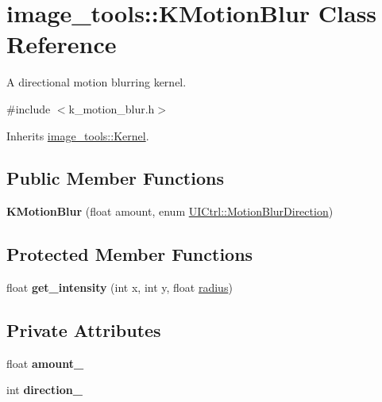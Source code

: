 \hypertarget{classimage__tools_1_1KMotionBlur}{}\section{image\+\_\+tools\+:\+:K\+Motion\+Blur Class Reference}
\label{classimage__tools_1_1KMotionBlur}


A directional motion blurring kernel.  




{\ttfamily \#include $<$k\+\_\+motion\+\_\+blur.\+h$>$}



Inherits \hyperlink{classimage__tools_1_1Kernel}{image\+\_\+tools\+::\+Kernel}.

\subsection*{Public Member Functions}
\begin{DoxyCompactItemize}
\item 
{\bfseries K\+Motion\+Blur} (float amount, enum \hyperlink{classimage__tools_1_1UICtrl_a56d4f68bf91302769d7bc453d8d57cee}{U\+I\+Ctrl\+::\+Motion\+Blur\+Direction})\hypertarget{classimage__tools_1_1KMotionBlur_a75b9862095f6df793defe84f13b339cb}{}\label{classimage__tools_1_1KMotionBlur_a75b9862095f6df793defe84f13b339cb}

\end{DoxyCompactItemize}
\subsection*{Protected Member Functions}
\begin{DoxyCompactItemize}
\item 
float {\bfseries get\+\_\+intensity} (int x, int y, float \hyperlink{classimage__tools_1_1Kernel_ac834d16a242dd4a15f5f5e4a6dacea01}{radius})\hypertarget{classimage__tools_1_1KMotionBlur_a1a453c33891327ff252ea69ea0478ba7}{}\label{classimage__tools_1_1KMotionBlur_a1a453c33891327ff252ea69ea0478ba7}

\end{DoxyCompactItemize}
\subsection*{Private Attributes}
\begin{DoxyCompactItemize}
\item 
float {\bfseries amount\+\_\+}\hypertarget{classimage__tools_1_1KMotionBlur_ada21399075e72161c3b18bc488eb5eec}{}\label{classimage__tools_1_1KMotionBlur_ada21399075e72161c3b18bc488eb5eec}

\item 
int {\bfseries direction\+\_\+}\hypertarget{classimage__tools_1_1KMotionBlur_ae0eaeda3f648c6d3a490fbd2ceedc8a0}{}\label{classimage__tools_1_1KMotionBlur_ae0eaeda3f648c6d3a490fbd2ceedc8a0}

\end{DoxyCompactItemize}


